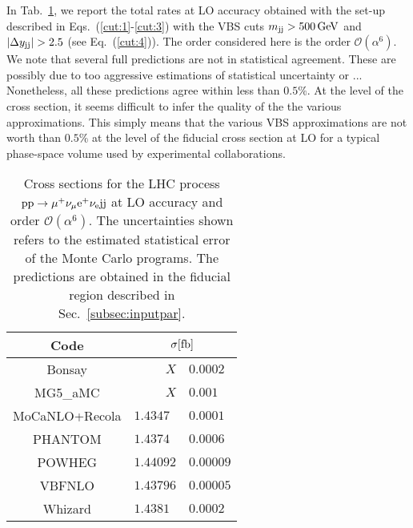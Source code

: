 In Tab.~\ref{tab:wg1_LOrates}, we report the total rates at LO accuracy obtained with the set-up described in Eqs.~(\ref{cut:1}-\ref{cut:3}) with the VBS cuts $m_{\text{j}\text{j}} > 500 \,\text{GeV}$ and $|\Delta y_{\text{j}\text{j}}| > 2.5$ (see Eq.~(\ref{cut:4})).
The order considered here is the order $\mathcal{O}(\alpha^6)$.
We note that several full predictions are not in statistical agreement.
These are possibly due to too aggressive estimations of statistical uncertainty or ... 
Nonetheless, all these predictions agree within less than $0.5\%$.
At the level of the cross section, it seems difficult to infer the quality of the the various approximations.
This simply means that the various VBS approximations are not worth than $0.5\%$ at the level of the fiducial cross section at LO for a typical phase-space volume used by experimental collaborations.

\begin{table}[h!]
    \centering
    \begin{tabular}{c|r@{ $\pm$ }l}
      Code  &  \multicolumn{2}{c}{$\sigma[\rm{fb}]$}  \\
        \hline
        \hline
        {\sc Bonsay}  &  $X$ & $0.0002$ \\
        {\sc MG5\_aMC}&  $X$ & $0.001$  \\
        {\sc MoCaNLO+Recola}  &  $1.4347\phantom{0}$ & $0.0001$ \\
        {\sc PHANTOM} &  $1.4374\phantom{0}$ & $0.0006 $  \\
        {\sc POWHEG}  &  $1.44092$ & $0.00009$ \\
        {\sc VBFNLO}  &  $1.43796$ & $0.00005$ \\
        {\sc Whizard} &  $1.4381\phantom{0}$ & $0.0002 $
    \end{tabular}
    \caption{\label{tab:wg1_LOrates} Cross sections for the LHC process ${\rm p}{\rm p}\to\mu^+\nu_\mu{\rm e}^+\nu_{\rm e}{\rm j}{\rm j}$ at LO accuracy and order $\mathcal{O}(\alpha^6)$.
    The uncertainties shown refers to the estimated statistical error of the Monte Carlo programs.
    The predictions are obtained in the fiducial region described in Sec.~\ref{subsec:inputpar}.
    }
\end{table}
